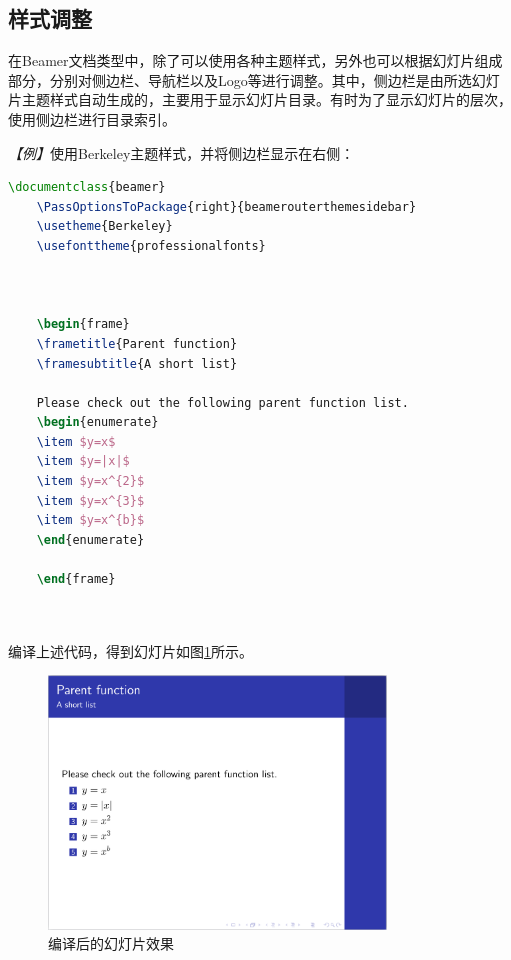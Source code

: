 \subsection{样式调整}

在Beamer文档类型中，除了可以使用各种主题样式，另外也可以根据幻灯片组成部分，分别对侧边栏、导航栏以及Logo等进行调整。其中，侧边栏是由所选幻灯片主题样式自动生成的，主要用于显示幻灯片目录。有时为了显示幻灯片的层次，使用侧边栏进行目录索引。

\emph{【例】}使用Berkeley主题样式，并将侧边栏显示在右侧：
\begin{lstlisting}[language=TeX]
    \documentclass{beamer}
    \PassOptionsToPackage{right}{beamerouterthemesidebar}
    \usetheme{Berkeley}
    \usefonttheme{professionalfonts}

    

    \begin{frame}
    \frametitle{Parent function}
    \framesubtitle{A short list}

    Please check out the following parent function list.
    \begin{enumerate}
    \item $y=x$
    \item $y=|x|$
    \item $y=x^{2}$
    \item $y=x^{3}$
    \item $y=x^{b}$
    \end{enumerate}

    \end{frame}

    
\end{lstlisting}

编译上述代码，得到幻灯片如图\ref{fig:933}所示。

\begin{figure}[htbp]
    \centering
    \includegraphics[width = 0.8\textwidth]{images/ch_9/example_sec2_6.png}
    \caption{编译后的幻灯片效果}
    \label{fig:933}
\end{figure}

